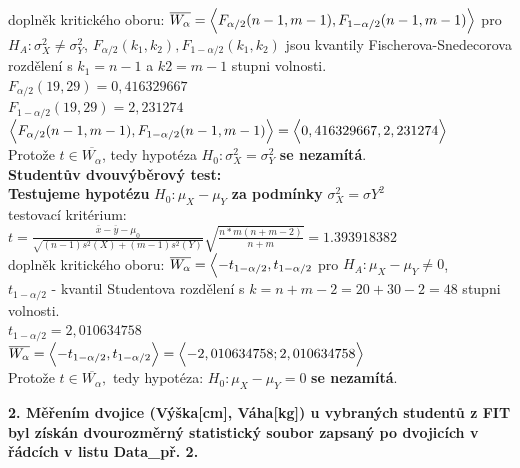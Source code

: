 \documentclass[11pt,a4paper]{article}
\begin{document}
doplněk kritického oboru: $ \overline{W_\alpha} = \Bigl< F_{\alpha/2} (n - 1, m - 1), F_{1-\alpha/2} (n - 1, m - 1) \Bigr> $ pro $ H_A : \sigma_{X}^2 \ne \sigma_{Y}^2$, $F_{\alpha/2}(k_1, k_2), F_{1-\alpha/2}(k_{1}, k_2) $ jsou kvantily Fischerova-Snedecorova rozdělení s $ k_1 = n - 1 $ a $ k2 = m - 1 $ stupni volnosti. \\

$ F_{\alpha/2}(19, 29) = 0,416329667 $ \\

$ F_{1-\alpha/2}(19, 29) = 2,231274 $ \\

$ \Bigl< F_{\alpha/2} (n - 1, m - 1), F_{1-\alpha/2} (n - 1, m - 1) \Bigr> = \Bigl< 0,416329667, 2,231274 \Bigr> $ \\

Protože $ t \in \overline{W_\alpha}$, tedy hypotéza $ H_0 : \sigma_{X}^2 = \sigma_{Y}^2$ \textbf{se nezamítá}. \\

\vspace{0,7cm}
\textbf{Studentův dvouvýběrový test:} \\
 
\textbf{Testujeme hypotézu} $ H_0 : \mu_X - \mu_Y $ \textbf{za podmínky} $ \sigma_{X}^2 = \sigma{Y}^2 $\\

testovací kritérium: $ t = \frac{\overline{x} - \overline{y} - \mu_0}{\sqrt{(n - 1) s^2(X) + (m - 1) s^2(Y)} } \sqrt{ \frac{n * m(n + m - 2)}{n + m} } = 1.393918382 $ \\

doplněk kritického oboru: $ \overline{W_\alpha} = \Bigl< -t_{1-\alpha/2}, t_{1-\alpha/2} $ pro $ H_A : \mu_X - \mu_Y \ne 0 $, \\

$ t_{1-\alpha/2} $ - kvantil Studentova rozdělení s $ k = n + m - 2 = 20 + 30 - 2 = 48 $ stupni volnosti. \\

$ t_{1-\alpha/2} = 2,010634758 $ \\

$ \overline{W_\alpha} = \Bigl< -t_{1-\alpha/2}, t_{1-\alpha/2} \Bigr> = \Bigl< -2,010634758; 2,010634758 \Bigr> $ \\

Protože $ t \in \overline{W_\alpha} ,$ tedy hypotéza: $ H_0 : \mu_X - \mu_Y = 0 $ \textbf{se nezamítá}.

\newpage

\textbf{2. Měřením dvojice (Výška[cm], Váha[kg]) u vybraných studentů z FIT byl získán dvourozměrný
statistický soubor zapsaný po dvojicích v řádcích v listu Data\_př. 2.}
\end{document}
